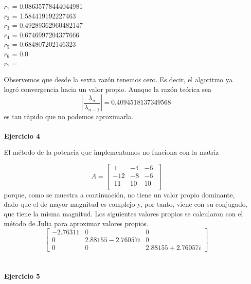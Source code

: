\documentclass[11pt]{article}
\begin{document}
\begin{multicols}{3}
\noindent
$ r_{1} $ = 0.08635778444044981 \\
$ r_{2} $ = 1.584419192227463 \\
$ r_{3} $ = 0.49289362960482147 \\
$ r_{4} $ = 0.6746997204377666 \\
$ r_{5} $ =  0.684807202146323 \\
$ r_{6} $ = 0.0 \\
$ r_{7} $ =  \\
\end{multicols}

Observemos que desde la sexta razón tenemos cero. Es decir, el algoritmo
ya logró convergencia hacia un valor propio. Aunque la razón teórica sea $$
\left| \frac{\lambda_n}{\lambda_{n-1}} \right| = 0.4094518137349568
$$ es tan
rápido que no podemos aproximarla.
\\
\\
\noindent
\textbf{Ejercicio 4}

\noindent
El método de la potencia que implementamos no funciona con la matriz

$$
A =
\begin{bmatrix}
 \ 1 & -4 & -6 \ \\
-12 & -8 & -6 \ \\
 \ 11 & 10 & 10 \ \\
\end{bmatrix}
$$
porque, como se muestra a continuación, no tiene un valor propio dominante, dado que el de mayor magnitud es complejo y, por tanto, viene con su conjugado, que tiene la misma magnitud. Los siguientes valores propios se calcularon con el método de Julia para aproximar valores propios.
$$
\begin{bmatrix}
 -2.76311 & 0 & 0 \\
 0 & 2.88155-2.76057i & 0 \\
 0 & 0 & 2.88155+2.76057i
\end{bmatrix}
$$
\\
\\

\noindent
\textbf{Ejercicio 5}
\end{document}
